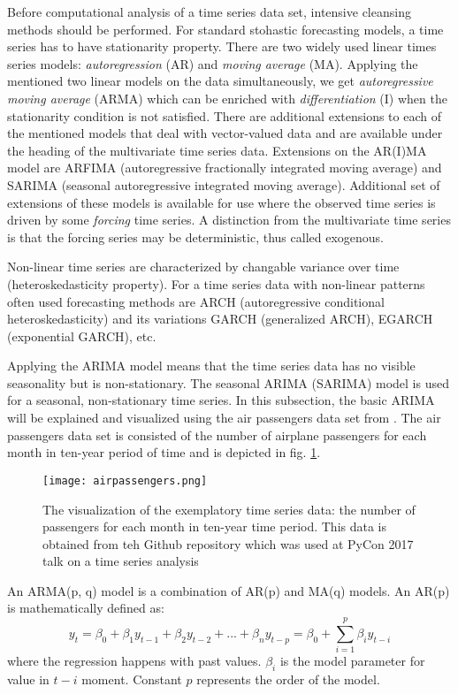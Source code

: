 Before computational analysis of a time series data set, intensive cleansing methods should be performed. 
For standard stohastic forecasting models, a time series has to have stationarity property.
There are two widely used linear times series models: \emph{autoregression} (AR) and \emph{moving average} (MA).
Applying the mentioned two linear models on the data simultaneously, we get \emph{autoregressive moving average} (ARMA) which can be enriched with \emph{differentiation} (I) when the stationarity condition is not satisfied.
There are additional extensions to each of the mentioned models that deal with vector-valued data and are available under the heading of the multivariate time series data. 
Extensions on the AR(I)MA model are ARFIMA (autoregressive fractionally integrated moving average) and SARIMA (seasonal autoregressive integrated moving average).
Additional set of extensions of these models is available for use where the observed time series is driven by some \textit{forcing} time series. 
A distinction from the multivariate time series is that the forcing series may be deterministic, thus called exogenous.

Non-linear time series are characterized by changable variance over time (heteroskedasticity property).
For a time series data with non-linear patterns often used forecasting methods are ARCH (autoregressive conditional heteroskedasticity) and its variations GARCH (generalized ARCH), EGARCH (exponential GARCH), etc.

Applying the ARIMA model means that the time series data has no visible seasonality but is non-stationary.
The seasonal ARIMA (SARIMA) model is used for a seasonal, non-stationary time series. 
In this subsection, the basic ARIMA will be explained and visualized using the air passengers data set from \cite{timeseriespython}.
The air passengers data set is consisted of the number of airplane passengers for each month in ten-year period of time and is depicted in fig. \ref{fig:airpassengers}.
\begin{figure}[h]
    \centering
    \texttt{[image: airpassengers.png]}
    \caption{The visualization of the exemplatory time series data: the number of passengers for each month in ten-year time period. This data is obtained from teh Github repository \cite{timeseriespython} which was used at PyCon 2017 talk on a time series analysis}
    \label{fig:airpassengers}
\end{figure}

An ARMA(p, q) model is a combination of AR(p) and MA(q) models. An AR(p) is mathematically defined as:
\begin{equation}
    y_{t} = \beta_{0} + \beta_{1}y_{t-1} + \beta_{2}y_{t-2} + ... + \beta_{n}y_{t-p} = \beta_{0} + \sum_{i=1}^{p}\beta_{i} y_{t-i}
\end{equation}
where the regression happens with past values. $\beta_{i}$ is the model parameter for value in $t-i$ moment. 
Constant $p$ represents the order of the model.

